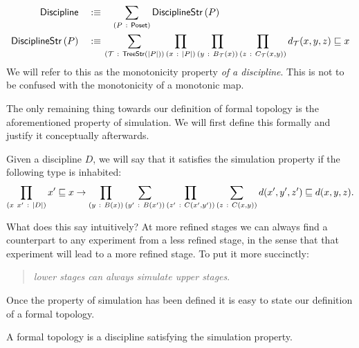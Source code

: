 \begin{defn}[Discipline]
  \begin{align*}
    \mathsf{Discipline} \quad&\is\quad \sigmaty{P}{\poset{}}{\disciplinestr{P}}                 \\
    \disciplinestr{P}   \quad&\is\quad \hspace{-0.9em}\sigmaty{\mathcal{T}}{\treestr{\abs{P}}}{
      \pity{x}{\abs{P}}{\pity{y}{B_{\mathcal{T}}(x)}{
          \pity{z}{C_{\mathcal{T}}(x, y)}{d_{\mathcal{T}}(x, y, z) \sqsubseteq x}}
      }
    }
  \end{align*}
  We will refer to this as the monotonicity property \emph{of a discipline}. This is not
  to be confused with the monotonicity of a monotonic map.
\end{defn}

The only remaining thing towards our definition of formal topology is the aforementioned
property of simulation. We will first define this formally and justify it conceptually
afterwards.
\begin{defn}
  Given a discipline $D$, we will say that it satisfies the simulation property if the
  following type is inhabited:
  \begin{equation*}
    \pity{x~x'}{\abs{D}}{
      x' \sqsubseteq x \rightarrow \pity{y}{B(x)}{
        \sigmaty{y'}{B(x')}{
          \pity{z'}{C(x', y')}{
            \sigmaty{z}{C(x, y)}{
              d(x', y', z') \sqsubseteq d(x, y, z)
            }
          }
        }
      }
    }.
  \end{equation*}
\end{defn}

What does this say intuitively? At more refined stages we can always find a counterpart to
any experiment from a less refined stage, in the sense that that experiment will lead to a
more refined stage. To put it more succinctly:
\begin{quote}
  \emph{lower stages can always simulate upper stages}.
\end{quote}

Once the property of simulation has been defined it is easy to state our
definition of a formal topology.
\begin{defn}
  A formal topology is a discipline satisfying the simulation property.
\end{defn}

